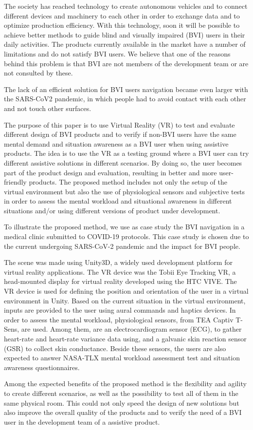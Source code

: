 
The society has reached technology to create autonomous vehicles and to connect different devices and machinery to each other in order to exchange data and to optimize production efficiency.  With this technology, soon it will be possible to achieve better methods to guide blind and visually impaired (BVI) users in their daily activities. The products currently available in the market have a number of limitations and do not satisfy BVI users. We believe that one of the reasons behind this problem is that BVI are not members of the development team or are not consulted by these. 

The lack of an efficient solution for BVI users navigation became even larger with the SARS-CoV2 pandemic, in which people had to avoid contact with each other and not touch other surfaces.

The purpose of this paper is to use Virtual Reality (VR) to test and evaluate different design of BVI products and to verify if non-BVI users have the same mental demand and situation awareness as a BVI user when using assistive products. The idea is to use the VR as a testing ground where a BVI user can try different assistive solutions in different scenarios. By doing so, the user becomes part of the product design and evaluation, resulting in better and more user-friendly products. The proposed method includes not only the setup of the virtual environment but also the use of physiological sensors and subjective tests in order to assess the mental workload and situational awareness in different situations and/or using different versions of product under development.

To illustrate the proposed method, we use as case study the BVI navigation in a medical clinic submitted to COVID-19 protocols. This case study is chosen due to the current undergoing SARS-CoV-2 pandemic and the impact for BVI people.

The scene was made using Unity3D, a widely used development platform for virtual reality applications. The VR device was the Tobii Eye Tracking VR, a head-mounted display for virtual reality developed using the HTC VIVE. The VR device is used for defining the position and orientation of the user in a virtual environment in Unity. Based on the current situation in the virtual environment, inputs are provided to the user using aural commands and haptics devices. In order to assess the mental workload, physiological sensors, from TEA Captiv T-Sens, are used. Among them, are an electrocardiogram sensor (ECG), to gather heart-rate and heart-rate variance data using, and a galvanic skin reaction sensor (GSR) to collect skin conductance. Beside these sensors, the users are also expected to answer NASA-TLX mental workload assessment test and situation awareness questionnaires.

Among the expected benefits of the proposed method is the flexibility and agility to create different scenarios, as well as the possibility to test all of them in the same physical room. This could not only speed the design of new solutions but also improve the overall quality of the products and to verify the need of a BVI user in the development team of a assistive product.